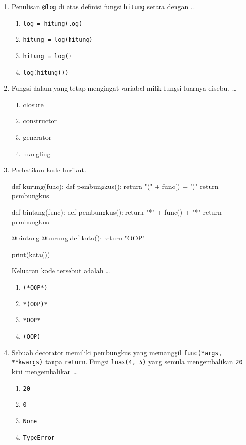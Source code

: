 \begin{enumerate}
  \item Penulisan \texttt{@log} di atas definisi fungsi \texttt{hitung} setara dengan \ldots
  \begin{enumerate}[label=\alph*.,itemsep=0pt]
    \item \texttt{log = hitung(log)}
    \item \texttt{hitung = log(hitung)}
    \item \texttt{hitung = log()}
    \item \texttt{log(hitung())}
  \end{enumerate}

  \item Fungsi dalam yang tetap mengingat variabel milik fungsi luarnya disebut \ldots
  \begin{enumerate}[label=\alph*.,itemsep=0pt]
    \item closure
    \item constructor
    \item generator
    \item mangling
  \end{enumerate}

  \item Perhatikan kode berikut.
\begin{kode}[Soal 7]
def kurung(func):
    def pembungkus():
        return "(" + func() + ")"
    return pembungkus

def bintang(func):
    def pembungkus():
        return "*" + func() + "*"
    return pembungkus

@bintang
@kurung
def kata():
    return "OOP"

print(kata())
\end{kode}
  Keluaran kode tersebut adalah \ldots
  \begin{enumerate}[label=\alph*.,itemsep=0pt]
    \item \texttt{(*OOP*)}
    \item \texttt{*(OOP)*}
    \item \texttt{*OOP*}
    \item \texttt{(OOP)}
  \end{enumerate}

  \item Sebuah decorator memiliki pembungkus yang memanggil \texttt{func(*args, **kwargs)} tanpa \texttt{return}. Fungsi \texttt{luas(4, 5)} yang semula mengembalikan \texttt{20} kini mengembalikan \ldots
  \begin{enumerate}[label=\alph*.,itemsep=0pt]
    \item \texttt{20}
    \item \texttt{0}
    \item \texttt{None}
    \item \texttt{TypeError}
  \end{enumerate}


\end{enumerate}
